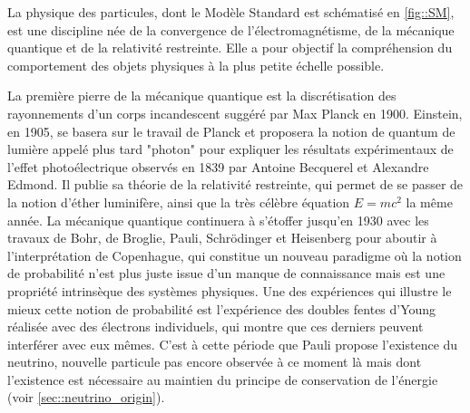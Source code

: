       La physique des particules, dont le Modèle Standard est schématisé en \autoref{fig::SM}, est une discipline née de la convergence de l'électromagnétisme, de la mécanique quantique et de la relativité restreinte. Elle a pour objectif la compréhension du comportement des objets physiques à la plus petite échelle possible.

      La première pierre de la mécanique quantique est la discrétisation des rayonnements d'un corps incandescent suggéré par Max Planck en 1900\cite{Planck1900}. Einstein, en 1905\cite{Einstein1905-quanta}, se basera sur le travail de Planck et proposera la notion de quantum de lumière appelé plus tard "photon" pour expliquer les résultats expérimentaux de l'effet photoélectrique observés en 1839 par Antoine Becquerel et Alexandre Edmond\cite{Becquerel1839}. Il publie sa théorie de la relativité restreinte\cite{Einstein1905-relat}, qui permet de se passer de la notion d'éther luminifère, ainsi que la très célèbre équation $E=mc^2$\cite{Einstein1905-emc2} la même année. La mécanique quantique continuera à s'étoffer jusqu'en 1930 avec les travaux de Bohr, de Broglie, Pauli, Schrödinger et Heisenberg pour aboutir à l'interprétation de Copenhague\cite{Heisenberg1949}, qui constitue un nouveau paradigme où la notion de probabilité n'est plus juste issue d'un manque de connaissance mais est une propriété intrinsèque des systèmes physiques. Une des expériences qui illustre le mieux cette notion de probabilité est l'expérience des doubles fentes d'Young réalisée avec des électrons individuels, qui montre que ces derniers peuvent interférer avec eux mêmes\cite{Merli1976,Rosa2012}. C'est à cette période que Pauli propose l'existence du neutrino\cite{Pauli1930}, nouvelle particule pas encore observée à ce moment là mais dont l'existence est nécessaire au maintien du principe de conservation de l'énergie (voir \autoref{sec::neutrino_origin}).


